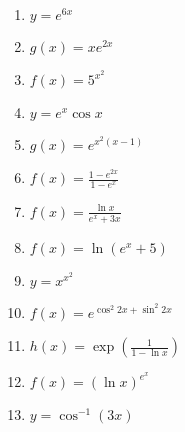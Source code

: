 \documentclass[12pt]{article}
\newif\ifans
\begin{document}
\begin{enumerate}

\item $y = e^{6x}$ 

\ifans{\fbox{$6e^{6x}$}} \fi

\item $g(x) = xe^{2x}$ 

\ifans{\fbox{$e^{2x}+2xe^{2x}$}} \fi

\item $f(x) = 5^{x^2}$ 

\ifans{\fbox{$2x\ln{(5)}5^{x^2}$}} \fi

\item $y = e^x\cos {x}$ 

\ifans{\fbox{$-e^{x}\sin{x}+e^{x}\cos{x}$}} \fi

\item $g(x) = e^{x^2(x-1)}$ 

\ifans{\fbox{$e^{x^2(x-1)}(3x^2-2x)$}} \fi

\item $f(x) = \frac{1-e^{2x}}{1-e^x}$ 

\ifans{\fbox{$e^x$}} \fi

\item $f(x) = \frac{\ln{x}}{e^{x}+3x}$ 

\ifans{\fbox{$\frac{e^x+3x-x\ln{(x)}e^x-3x\ln{(x)}}{x(e^x+3x)^2}$}} \fi

\item $f(x) = \ln{(e^{x}+5)}$ 

\ifans{\fbox{$\frac{e^{x}}{e^{x}+5}$}} \fi

\item $y=x^{x^2}$

\ifans{\fbox{$x^{x^2}(x+2x\ln{x})$}} \fi

\item $f(x) = e^{\cos^2{2x}+\sin^2{2x}}$ 

\ifans{\fbox{0}} \fi

\item $h(x) = \exp{\left(\frac{1}{1-\ln x}\right)}$ 

\ifans{\fbox{$\frac{1}{x(1-\ln{x})^2}\exp{\left(\frac{1}{1-\ln x}\right)}$}} \fi

\item $f(x) = (\ln{x})^{e^{x}}$ 

\ifans{\fbox{$(\ln{x})^{e^{x}}\left(\frac{e^{x}}{x\ln{x}}+e^{x}\ln{(\ln{x})}\right)$}} \fi

\item $y = \cos^{-1}{(3x)}$ 


\end{enumerate}
\end{document}
